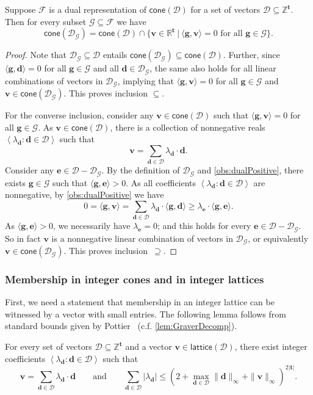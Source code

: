 \documentclass{article}
\renewcommand{\leq}{\leqslant}
\renewcommand{\geq}{\geqslant}
\newcommand{\Dd}{\mathcal{D}}
\newcommand{\Z}{\mathbb{Z}}
\newcommand{\R}{\mathbb{R}}
\newcommand{\tup}[1]{{\mathbf{#1}}}
\newcommand{\tv}{\tup t}
\renewcommand{\gg}{\tup g}
\newcommand{\dd}{\tup d}
\newcommand{\ee}{\tup e}
\newcommand{\myvv}{\tup v} %
\newcommand{\mset}[1]{\left\langle #1\right\rangle}
\newcommand{\Ff}{\mathcal{F}}
\newcommand{\Gg}{\mathcal{G}}
\newcommand{\sca}[2]{\langle #1,#2\rangle}
\renewcommand{\setminus}{-}
\newcommand{\realcone}{\mathsf{cone}}
\newcommand{\lattice}{\mathsf{lattice}}
\begin{document}
\begin{lemma}\label{lem:facetRepresentation}
 Suppose $\Ff$ is a dual representation of $\realcone(\Dd)$ for a set of vectors $\Dd\subseteq \Z^\tv$. Then for every subset $\Gg\subseteq \Ff$ we have
 $$\realcone(\Dd_\Gg) = \realcone(\Dd)\cap \{\myvv\in \R^{\tv}~|~\sca{\gg}{\myvv}=0\textrm{ for all }\gg\in \Gg\}.$$
\end{lemma}
\begin{proof}
 Note that $\Dd_\Gg\subseteq \Dd$ entails $\realcone(\Dd_\Gg)\subseteq \realcone(\Dd)$. Further, since $\sca{\gg}{\dd}=0$ for all $\gg\in \Gg$ and all $\dd\in \Dd_\Gg$, the same also holds for all linear combinations of vectors in $\Dd_\Gg$, implying that $\sca{\gg}{\myvv}=0$ for all $\gg\in \Gg$ and $\myvv\in \realcone(\Dd_\Gg)$. This proves inclusion $\subseteq$.

 For the converse inclusion, consider any $\myvv\in \realcone(\Dd)$ such that $\sca{\gg}{\myvv}=0$ for all $\gg\in \Gg$. As $\myvv\in \realcone(\Dd)$, there is a collection of nonnegative reals $\mset{\lambda_\dd\colon \dd\in \Dd}$ such that
 $$\myvv = \sum_{\dd\in \Dd} \lambda_\dd\cdot \dd.$$
 Consider any $\ee\in \Dd\setminus \Dd_\Gg$. By the definition of $\Dd_\Gg$ and \cref{obs:dualPositive}, there exists $\gg\in \Gg$ such that $\sca{\gg}{\ee}>0$. As all coefficients $\mset{\lambda_\dd\colon \dd\in \Dd}$ are nonnegative, by \cref{obs:dualPositive} we have
 $$0=\sca{\gg}{\myvv}=\sum_{\dd\in \Dd} \lambda_\dd\cdot \sca{\gg}{\dd} \geq \lambda_\ee\cdot \sca{\gg}{\ee}.$$
 As $\sca{\gg}{\ee}>0$, we necessarily have $\lambda_\ee=0$; and this holds for every $\ee\in \Dd\setminus \Dd_\Gg$. So in fact $\myvv$ is a nonnegative linear combination of vectors in $\Dd_\Gg$, or equivalently $\myvv\in \realcone(\Dd_\Gg)$. This proves inclusion~$\supseteq$.
\end{proof}

\subsubsection{Membership in integer cones and in integer lattices}

First, we need a statement that membership in an integer lattice can be witnessed by a vector with small entries. The following lemma follows from standard bounds given by Pottier~\cite[Corollary~4]{Pottier91} (c.f. \cref{lem:GraverDecomp}).

\begin{lemma}\label{lem:latticeSmallSol}
For every set of vectors $\Dd\subseteq \Z^\tv$ and a vector $\myvv\in \lattice(\Dd)$, there exist integer coefficients $\mset{\lambda_\dd\colon \dd\in \Dd}$ such that
$$\myvv=\sum_{\dd\in \Dd} \lambda_\dd\cdot \dd\qquad \textrm{and}\qquad \sum_{\dd\in \Dd} |\lambda_\dd|\leq \left(2+\max_{\dd\in \Dd} \|\dd\|_\infty+\|\myvv\|_\infty\right)^{2|\tv|}.$$
\end{lemma}
\end{document}
